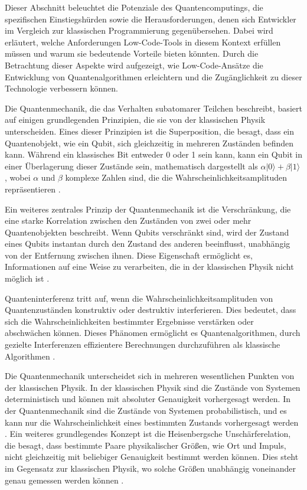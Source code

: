 Dieser Abschnitt beleuchtet die Potenziale des Quantencomputings, die spezifischen Einstiegshürden sowie die 
Herausforderungen, denen sich Entwickler im Vergleich zur klassischen Programmierung gegenübersehen. Dabei wird 
erläutert, welche Anforderungen Low-Code-Tools in diesem Kontext erfüllen müssen und warum sie bedeutende Vorteile 
bieten könnten. Durch die Betrachtung dieser Aspekte wird aufgezeigt, wie Low-Code-Ansätze die Entwicklung von 
Quantenalgorithmen erleichtern und die Zugänglichkeit zu dieser Technologie verbessern können.

Die Quantenmechanik, die das Verhalten subatomarer Teilchen beschreibt, basiert auf einigen grundlegenden Prinzipien, 
die sie von der klassischen Physik unterscheiden. Eines dieser Prinzipien ist die Superposition, die besagt, dass ein 
Quantenobjekt, wie ein Qubit, sich gleichzeitig in mehreren Zuständen befinden kann. Während ein klassisches Bit 
entweder 0 oder 1 sein kann, kann ein Qubit in einer Überlagerung dieser Zustände sein, mathematisch dargestellt 
als \( \alpha|0\rangle + \beta|1\rangle \), wobei \( \alpha \) und \( \beta \) komplexe Zahlen sind, die die 
Wahrscheinlichkeitsamplituden repräsentieren \cite{nielsen2010quantum}.

Ein weiteres zentrales Prinzip der Quantenmechanik ist die Verschränkung, die eine starke Korrelation zwischen den 
Zuständen von zwei oder mehr Quantenobjekten beschreibt. Wenn Qubits verschränkt sind, wird der Zustand eines Qubits 
instantan durch den Zustand des anderen beeinflusst, unabhängig von der Entfernung zwischen ihnen. Diese Eigenschaft 
ermöglicht es, Informationen auf eine Weise zu verarbeiten, die in der klassischen Physik nicht möglich ist 
\cite{einstein1935can}.

Quanteninterferenz tritt auf, wenn die Wahrscheinlichkeitsamplituden von Quantenzuständen konstruktiv oder 
destruktiv interferieren. Dies bedeutet, dass sich die Wahrscheinlichkeiten bestimmter Ergebnisse verstärken oder 
abschwächen können. Dieses Phänomen ermöglicht es Quantenalgorithmen, durch gezielte Interferenzen effizientere 
Berechnungen durchzuführen als klassische Algorithmen \cite{feynman2018simulating}.

Die Quantenmechanik unterscheidet sich in mehreren wesentlichen Punkten von der klassischen Physik. In der 
klassischen Physik sind die Zustände von Systemen deterministisch und können mit absoluter Genauigkeit 
vorhergesagt werden. In der Quantenmechanik sind die Zustände von Systemen probabilistisch, und es kann 
nur die Wahrscheinlichkeit eines bestimmten Zustands vorhergesagt werden \cite{griffiths2018introduction}. 
Ein weiteres grundlegendes Konzept ist die Heisenbergsche Unschärferelation, die besagt, dass bestimmte Paare 
physikalischer Größen, wie Ort und Impuls, nicht gleichzeitig mit beliebiger Genauigkeit bestimmt werden können. 
Dies steht im Gegensatz zur klassischen Physik, wo solche Größen unabhängig voneinander genau gemessen werden 
können \cite{heisenberg1927anschaulichen}.

